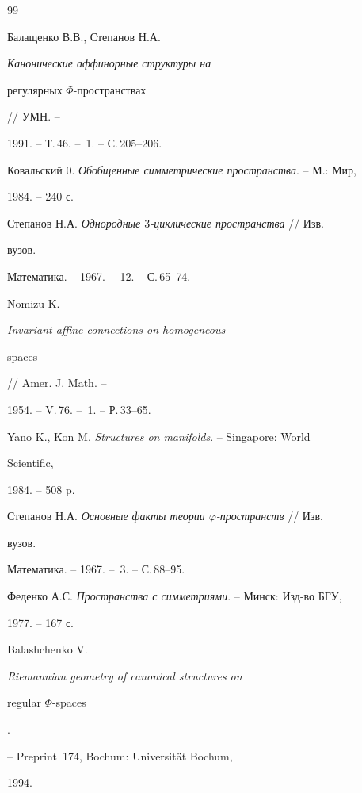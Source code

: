 \begin{thebibliography}{99} 


 




Балащенко В.В., Степанов Н.А. {\em Канонические аффинорные структуры на 


регулярных $\Phi$-пространствах} // УМН. -- 


1991. -- Т.\,46. -- \No\,1. -- С.\,205--206. 




Ковальский 0. {\em Обобщенные симметрические пространства}. -- М.: Мир, 


1984. -- 240 с.




Степанов Н.А. {\em Однородные $3$-циклические пространства} // Изв. 


вузов. 


Математика. -- 1967. -- \No\,12. -- С.\,65--74. 




Nomizu K. {\em Invariant affine connections on homogeneous 


spaces} // Amer. J. Math. -- 


1954. -- V.\,76. -- \No\,1. -- Р.\,33--65. 




Yano K., Kon M. {\em Structures on manifolds}. -- Singapore: World 


Scientific, 


1984. -- 508 p. 




Степанов Н.А. {\em Основные факты теории $\varphi$-пространств} // Изв. 


вузов. 


Математика. -- 1967. -- \No\,3. -- С.\,88--95. 




Феденко А.С. {\em Пространства с симметриями}. -- Минск: Изд-во БГУ, 


1977. -- 167 с.




Balashchenko V. {\em Riemannian geometry of canonical structures on 


regular $\Phi$-spaces}. 


-- Preprint \No\,174, Bochum: Universit\"at Bochum,  


1994.





\end{thebibliography}
